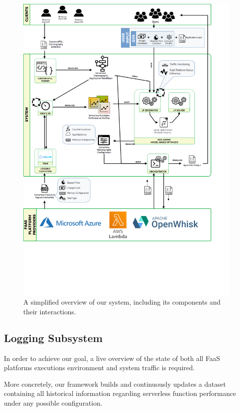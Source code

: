 \documentclass[12pt,a4paper]{report}
\begin{document}
\begin{figure}[h!]
	\centering
	\includegraphics[width=\textwidth, height=0.9\textheight]{./Images/System.png}
	\caption{A simplified overview of our system, including its components and their interactions.}%
	\label{Overview}
\end{figure}

\subsection{Logging Subsystem}

In order to achieve our goal, a live overview of the state of both all FaaS platforms executions environment and system traffic is required.

More concretely, our framework builds and continuously updates a dataset containing all historical information regarding serverless function performance under any possible configuration.
\end{document}
